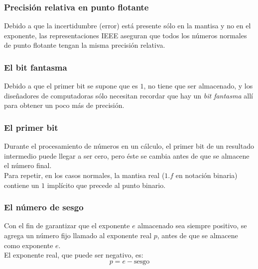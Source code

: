 \documentclass[12pt]{beamer}
\begin{document}
\begin{frame}
\frametitle{Precisión relativa en punto flotante}
Debido a que la incertidumbre (error) está presente sólo en la mantisa y no en el exponente, las representaciones IEEE aseguran que todos los números normales de punto flotante tengan la misma precisión relativa.
\end{frame}
\begin{frame}
\frametitle{El bit fantasma}
Debido a que el primer bit se supone que es $1$, no tiene que ser almacenado, y los diseñadores de computadoras sólo necesitan recordar que hay un \emph{bit fantasma} allí para obtener un poco más de precisión.
\end{frame}
\begin{frame}
\frametitle{El primer bit}
Durante el procesamiento de números en un cálculo, el primer bit de un resultado intermedio puede llegar a ser cero, pero éste se cambia antes de que se almacene el número final.
\\
\bigskip
\pause
Para repetir, en los casos normales, la mantisa real ($1.f$ en notación binaria) contiene un $1$ implícito que precede al punto binario.
\end{frame}
\begin{frame}
\frametitle{El número de sesgo}
Con el fin de garantizar que el exponente $e$ almacenado sea siempre positivo, se agrega un número fijo llamado  al exponente real $p$, antes de que se almacene como exponente $e$.
\\
\bigskip
\pause
El exponente real, que puede ser negativo, es:
\pause
\begin{equation}
p = e - \text{sesgo}
\label{eq:ecuacion_01_03b}
\end{equation}
\end{frame}




\end{document}
